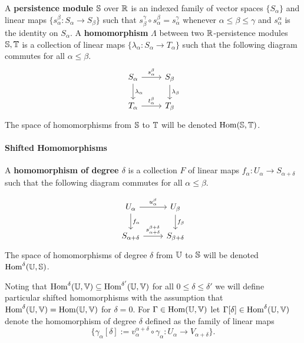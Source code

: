 
A \textbf{persistence module} $\S$ over $\R$ is an indexed family of vector spaces $\{S_\alpha\}$ and linear maps $\{s_\alpha^\beta : S_\alpha\to S_\beta\}$ such that $s^\gamma_\beta\circ s_\alpha^\beta = s_\alpha^\gamma$ whenever $\alpha\leq\beta\leq\gamma$ and $s_\alpha^\alpha$ is the identity on $S_\alpha$.
A \textbf{homomorphism} $\Lambda$ between two $\R$-persistence modules $\S, \T$ is a collection of linear maps $\{\lambda_\alpha : S_\alpha\to T_\alpha\}$ such that the following diagram commutes for all $\alpha\leq\beta$.
\begin{equation}\label{dgm:homomorphism}
  \begin{tikzcd}
    S_\alpha\arrow{r}{s_\alpha^\beta}\arrow{d}{\lambda_\alpha} &
    S_\beta\arrow{d}{\lambda_\beta}\\
    T_\alpha\arrow{r}{t_\alpha^\beta} &
    T_\beta
\end{tikzcd}\end{equation}
The space of homomorphisms from $\S$ to $\T$ will be denoted $\Hom(\S, \T)$.

\paragraph{Shifted Homomorphisms}

A \textbf{homomorphism of degree $\delta$} is a collection $F$ of linear maps $f_\alpha : U_\alpha\to S_{\alpha+\delta}$ such that the following diagram commutes for all $\alpha\leq\beta$.

\begin{equation}\label{dgm:shifted_homomorphism}
  \begin{tikzcd}
    U_\alpha\arrow{r}{u_\alpha^\beta}\arrow{d}{f_\alpha} &
    U_\beta\arrow{d}{f_\beta}\\
    S_{\alpha+\delta}\arrow{r}{s_{\alpha+\delta}^{\beta+\delta}} &
    S_{\beta +\delta}
\end{tikzcd}\end{equation}
The space of homomorphisms of degree $\delta$ from $\UU$ to $\S$ will be denoted $\Hom^\delta(\UU, \S)$.

Noting that $\Hom^\delta(\UU,\VV)\subseteq\Hom^{\delta'}(\UU,\VV)$ for all $0\leq\delta\leq\delta'$ we will define particular shifted homomorphisms with the assumption that $\Hom^\delta(\UU,\VV) = \Hom(\UU,\VV)$ for $\delta = 0$.
For $\Gamma\in\Hom(\UU,\VV)$ let $\Gamma[\delta]\in\Hom^\delta(\UU,\VV)$ denote the homomorphism of degree $\delta$ defined as the family of linear maps
\[\{\gamma_\alpha[\delta] := v_\alpha^{\alpha+\delta}\circ \gamma_\alpha : U_\alpha\to V_{\alpha+\delta}\}.\]

